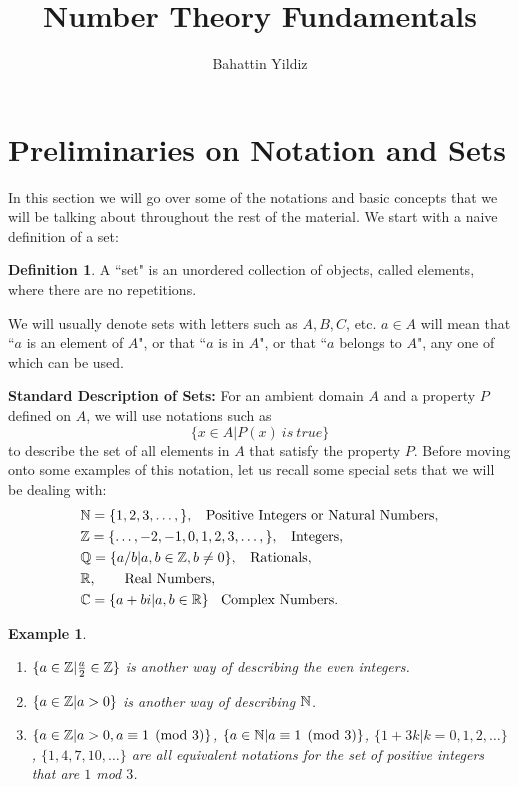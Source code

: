 \documentclass[12pt]{article}
\title{Number Theory Fundamentals}
\author{Bahattin Yildiz }
\date{}
\theoremstyle{plain}
\newtheorem{example}{Example}
\theoremstyle{definition}
\newtheorem{definition}{Definition}
\theoremstyle{remark}
\begin{document}
\maketitle
\section{Preliminaries on Notation and Sets}
In this section we will go over some of the notations and basic concepts that we will be talking about throughout the rest of the material. 
We start with a naive definition of a set:
\begin{definition}
A ``set" is an unordered collection of objects, called elements, where there are no repetitions. 
\end{definition}

We will usually denote sets with letters such as $A, B, C$, etc. $a\in A$ will mean that ``$a$ is an element of $A$", or that ``$a$ is in $A$", or that ``$a$ belongs to $A$", any one of which can be used. 

{\bf Standard Description of Sets:} For an ambient domain $A$ and a property $P$ defined on $A$, we will use notations such as 
$$\{x\in A| P(x)\: is\: true\}$$
to describe the set of all elements in $A$ that satisfy the property $P$. 
Before moving onto some examples of this notation, let us recall some special sets that we will be dealing with:
\begin{align*}
&\mathbb{N} = \{1, 2, 3, \dots, \},\:\:\:\:\textrm{Positive Integers or Natural Numbers},\\
&\mathbb{Z} = \{\dots, -2, -1, 0, 1, 2, 3, \dots, \},\:\:\:\:\textrm{Integers},\\ 
& \mathbb{Q} = \{a/b| a,b \in \mathbb{Z}, b\neq 0\}, \:\:\:\:\textrm{Rationals},\\
&\mathbb{R}, \:\:\:\:\: \:\:\:\:\textrm{Real Numbers},\\
& \mathbb{C} = \{a+bi| a,b \in \mathbb{R}\} \:\:\:\:\textrm{Complex Numbers}.
\end{align*}

\begin{example}
\begin{enumerate}
    \item $\{a\in \mathbb{Z}| \frac{a}{2}\in \mathbb{Z}\}$ is another way of describing the even integers.
    \item $\{a\in \mathbb{Z}|a>0\}$ is another way of describing $\mathbb{N}$. 
    \item $\{a\in \mathbb{Z}|a>0, a\equiv 1\pmod{3}\}$, $\{a\in \mathbb{N}|a\equiv 1\pmod{3}\}$, $\{1+3k|k=0,1,2, \dots \}$, $\{1,4,7,10, \dots \}$
    are all equivalent notations for the set of positive integers that are $1$ mod $3$. 
\end{enumerate}
\end{example}
\end{document}
